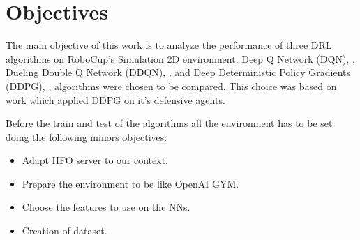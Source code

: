 \chapter{Objectives}
The main objective of this work is to analyze the performance of three DRL algorithms on RoboCup's Simulation 2D environment. Deep Q Network (DQN), \cite{dqn}, Dueling Double Q Network (DDQN), \cite{DDQN}, and Deep Deterministic Policy Gradients (DDPG), \cite{DDPG}, algorithms were chosen to be compared. This choice was based on \cite{cyrus} work which applied DDPG on it's defensive agents.

Before the train and test of the algorithms all the environment has to be set doing the following minors objectives:
\begin{itemize}
    \item Adapt HFO server to our context.
    \item Prepare the environment to be like OpenAI GYM.
    \item Choose the features to use on the NNs.
    \item Creation of dataset.
\end{itemize}